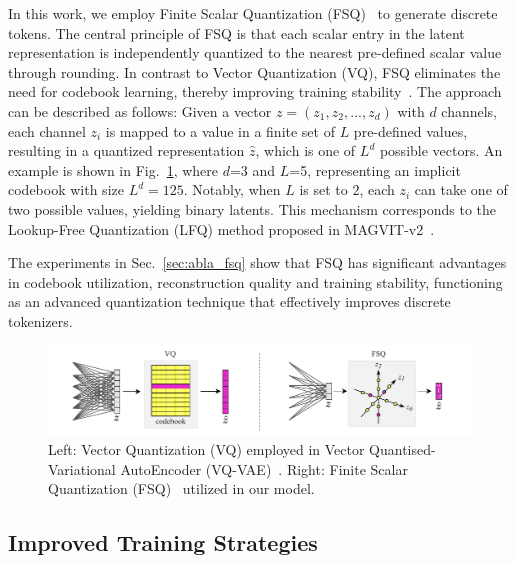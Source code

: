 \documentclass{article} %
\begin{document}
In this work, we employ Finite Scalar Quantization (FSQ)~\citep{mentzer2024finite} to generate discrete tokens. The central principle of FSQ is that each scalar entry in the latent representation is independently quantized to the nearest pre-defined scalar value through rounding. In contrast to Vector Quantization (VQ), FSQ eliminates the need for codebook learning, thereby improving training stability~\citep{mentzer2024finite,yu2024language}. The approach can be described as follows: Given a vector $z=(z_1, z_2, ..., z_d)$ with $d$ channels, each channel $z_i$ is mapped to a value in a finite set of $L$ pre-defined values, resulting in a quantized representation $\hat{z}$, which is one of $L^d$ possible vectors. An example is shown in Fig.~\ref{fig:fsq}, where $d$=3 and $L$=5, representing an implicit codebook with size $L^d=125$. Notably, when $L$ is set to $2$, each $z_i$ can take one of two possible values, yielding binary latents. This mechanism corresponds to the Lookup-Free Quantization (LFQ) method proposed in MAGVIT-v2~\citep{yu2024language}.

The experiments in Sec.~\ref{sec:abla_fsq} show that FSQ has significant advantages in codebook utilization, reconstruction quality and training stability, functioning as an advanced quantization technique that effectively improves discrete tokenizers.


\begin{figure}[t]
  \centering
  \includegraphics[width=0.98\linewidth]{imgs/fsq.pdf}
  \caption{Left: Vector Quantization (VQ) employed in Vector Quantised-Variational AutoEncoder (VQ-VAE)~\citep{van2017neuralvqvae}. Right: Finite Scalar Quantization (FSQ)~\citep{mentzer2024finite} utilized in our model.}
  \vspace{-3mm}
  \label{fig:fsq}
\end{figure}


\subsection{Improved Training Strategies}
\label{sec:training_strategy}
\end{document}
